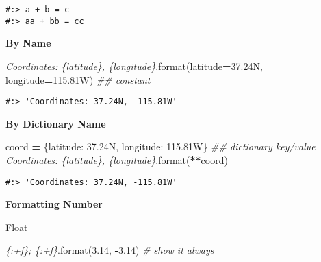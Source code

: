 \documentclass[
]{book}
\newenvironment{Shaded}{\begin{snugshade}}{\end{snugshade}}
\newcommand{\BuiltInTok}[1]{#1}
\newcommand{\CommentTok}[1]{\textcolor[rgb]{0.37,0.37,0.37}{\textit{#1}}}
\newcommand{\FloatTok}[1]{\textcolor[rgb]{0.06,0.06,0.06}{#1}}
\newcommand{\NormalTok}[1]{#1}
\newcommand{\OperatorTok}[1]{\textcolor[rgb]{0.43,0.43,0.43}{\textbf{#1}}}
\newcommand{\StringTok}[1]{\textcolor[rgb]{0.5,0.5,0.5}{#1}}
\begin{document}
\begin{verbatim}
#:> a + b = c 
#:> aa + bb = cc
\end{verbatim}

\textbf{By Name}

\begin{Shaded}
\begin{Highlighting}[]
\CommentTok{\textquotesingle{}Coordinates: \{latitude\}, \{longitude\}\textquotesingle{}}\NormalTok{.}\BuiltInTok{format}\NormalTok{(latitude}\OperatorTok{=}\StringTok{\textquotesingle{}37.24N\textquotesingle{}}\NormalTok{, longitude}\OperatorTok{=}\StringTok{\textquotesingle{}{-}115.81W\textquotesingle{}}\NormalTok{) }\CommentTok{\#\# constant}
\end{Highlighting}
\end{Shaded}

\begin{verbatim}
#:> 'Coordinates: 37.24N, -115.81W'
\end{verbatim}

\textbf{By Dictionary Name}

\begin{Shaded}
\begin{Highlighting}[]
\NormalTok{coord }\OperatorTok{=}\NormalTok{ \{}\StringTok{\textquotesingle{}latitude\textquotesingle{}}\NormalTok{: }\StringTok{\textquotesingle{}37.24N\textquotesingle{}}\NormalTok{, }\StringTok{\textquotesingle{}longitude\textquotesingle{}}\NormalTok{: }\StringTok{\textquotesingle{}{-}115.81W\textquotesingle{}}\NormalTok{\} }\CommentTok{\#\# dictionary key/value}
\CommentTok{\textquotesingle{}Coordinates: \{latitude\}, \{longitude\}\textquotesingle{}}\NormalTok{.}\BuiltInTok{format}\NormalTok{(}\OperatorTok{**}\NormalTok{coord)}
\end{Highlighting}
\end{Shaded}

\begin{verbatim}
#:> 'Coordinates: 37.24N, -115.81W'
\end{verbatim}

\textbf{Formatting Number}

Float

\begin{Shaded}
\begin{Highlighting}[]
\CommentTok{\textquotesingle{}\{:+f\}; \{:+f\}\textquotesingle{}}\NormalTok{.}\BuiltInTok{format}\NormalTok{(}\FloatTok{3.14}\NormalTok{, }\OperatorTok{{-}}\FloatTok{3.14}\NormalTok{)  }\CommentTok{\# show it always}
\end{Highlighting}
\end{Shaded}
\end{document}

